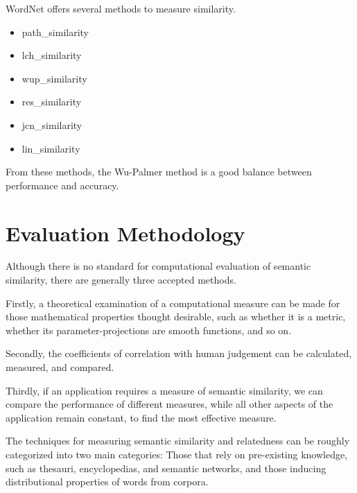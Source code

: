 \documentclass{article}
\begin{document}
WordNet offers several methods to measure similarity.
\begin{itemize}
	\item path\_similarity
	\item lch\_similarity
	\item wup\_similarity
	\item res\_similarity
	\item jcn\_similarity
	\item lin\_similarity
\end{itemize}

From these methods, the Wu-Palmer method is a good balance between performance and accuracy.\cite{budanitsky2006evaluating,seco2004intrinsic,mihalcea2006corpus}

\section{Evaluation Methodology}

Although there is no standard for computational evaluation of semantic similarity, there are generally three accepted methods.\cite{meng2013review}

Firstly, a theoretical examination of a computational measure can be made for those mathematical properties thought desirable, such as whether it is a metric, whether its parameter-projections are smooth functions, and so on. %

Secondly, the coefficients of correlation with human judgement can be calculated, measured, and compared.\cite{zhou2008new,seco2004intrinsic}

Thirdly, if an application requires a measure of semantic similarity, we can compare the performance of different measures, while all other aspects of the application remain constant, to find the most effective measure.\cite{blanchard2006tree,budanitsky2006evaluating}

The techniques for measuring semantic similarity and relatedness can be roughly categorized into two main categories:\cite{agirre2009study} Those that rely on pre-existing knowledge, such as thesauri, encyclopedias, and semantic networks,\cite{alvarez2007graph,yang2005measuring,hughes2007lexical} and those inducing distributional properties of words from corpora.\cite{sahami2006web,chen2006novel,bollegala2007measuring}
\end{document}
